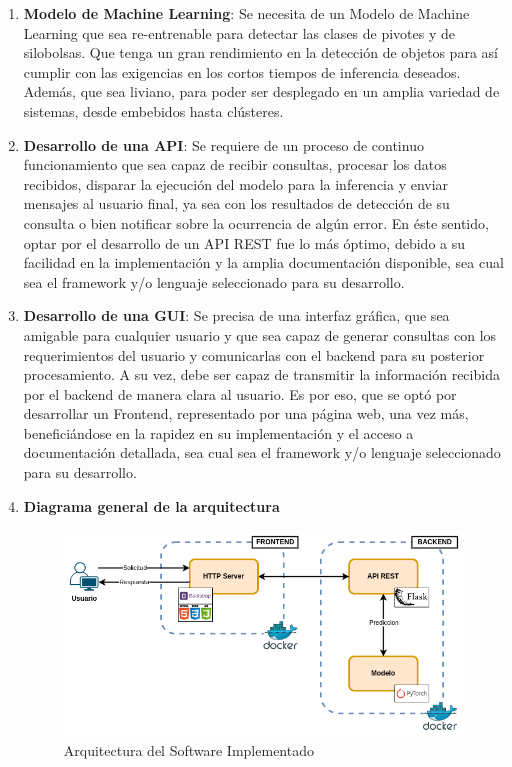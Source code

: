 \begin{enumerate}

    \item \textbf{Modelo de Machine Learning}: Se necesita de un Modelo de Machine Learning que sea re-entrenable para detectar las clases de pivotes y de silobolsas. Que tenga un gran rendimiento en la detección de objetos para así cumplir con las exigencias en los cortos tiempos de inferencia deseados. Además, que sea liviano, para poder ser desplegado en un amplia variedad de sistemas, desde embebidos hasta clústeres.

    \item \textbf{Desarrollo de una API}: Se requiere de un proceso de continuo funcionamiento que sea capaz de recibir consultas, procesar los datos recibidos, disparar la ejecución del modelo para la inferencia y enviar mensajes al usuario final, ya sea con los resultados de detección de su consulta o bien notificar sobre la ocurrencia de algún error. En éste sentido, optar por el desarrollo de un API REST fue lo más óptimo, debido a su facilidad en la implementación y la amplia documentación disponible, sea cual sea el framework y/o lenguaje seleccionado para su desarrollo.

    \item \textbf{Desarrollo de una GUI}: Se precisa de una interfaz gráfica, que sea amigable para cualquier usuario y que sea capaz de generar consultas con los requerimientos del usuario y comunicarlas con el backend para su posterior procesamiento. A su vez, debe ser capaz de transmitir la información recibida por el backend de manera clara al usuario. Es por eso, que se optó por desarrollar un Frontend, representado por una página web, una vez más, beneficiándose en la rapidez en su implementación y el acceso a documentación detallada, sea cual sea el framework y/o lenguaje seleccionado para su desarrollo.

    \item \textbf{Diagrama general de la arquitectura}
    \begin{figure}[h!]
        \centering
        \includegraphics[width=1\textwidth,center]{img/BE - API - FE.drawio.png}
        \caption{Arquitectura del Software Implementado}
        \label{fig:be - api - fe}
    \end{figure}
\end{enumerate}

